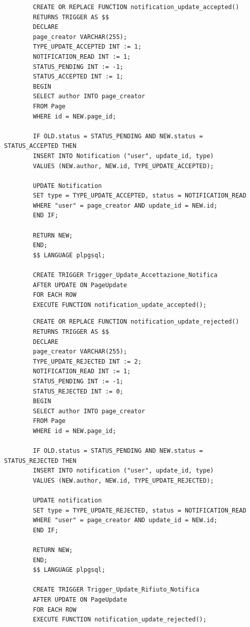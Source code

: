 \documentclass{article}
\begin{document}
	\begin{lstlisting}
		CREATE OR REPLACE FUNCTION notification_update_accepted()
		RETURNS TRIGGER AS $$
		DECLARE
		page_creator VARCHAR(255);
		TYPE_UPDATE_ACCEPTED INT := 1;
		NOTIFICATION_READ INT := 1;
		STATUS_PENDING INT := -1;
		STATUS_ACCEPTED INT := 1;
		BEGIN
		SELECT author INTO page_creator
		FROM Page
		WHERE id = NEW.page_id;
		
		IF OLD.status = STATUS_PENDING AND NEW.status = STATUS_ACCEPTED THEN
		INSERT INTO Notification ("user", update_id, type)
		VALUES (NEW.author, NEW.id, TYPE_UPDATE_ACCEPTED);
		
		UPDATE Notification
		SET type = TYPE_UPDATE_ACCEPTED, status = NOTIFICATION_READ
		WHERE "user" = page_creator AND update_id = NEW.id;
		END IF;
		
		RETURN NEW;
		END;
		$$ LANGUAGE plpgsql;
		
		CREATE TRIGGER Trigger_Update_Accettazione_Notifica
		AFTER UPDATE ON PageUpdate
		FOR EACH ROW
		EXECUTE FUNCTION notification_update_accepted();
	\end{lstlisting}
	
	\begin{lstlisting}
		CREATE OR REPLACE FUNCTION notification_update_rejected()
		RETURNS TRIGGER AS $$
		DECLARE
		page_creator VARCHAR(255);
		TYPE_UPDATE_REJECTED INT := 2;
		NOTIFICATION_READ INT := 1;
		STATUS_PENDING INT := -1;
		STATUS_REJECTED INT := 0;
		BEGIN
		SELECT author INTO page_creator
		FROM Page
		WHERE id = NEW.page_id;
		
		IF OLD.status = STATUS_PENDING AND NEW.status = STATUS_REJECTED THEN
		INSERT INTO notification ("user", update_id, type)
		VALUES (NEW.author, NEW.id, TYPE_UPDATE_REJECTED);
		
		UPDATE notification
		SET type = TYPE_UPDATE_REJECTED, status = NOTIFICATION_READ
		WHERE "user" = page_creator AND update_id = NEW.id;
		END IF;
		
		RETURN NEW;
		END;
		$$ LANGUAGE plpgsql;
		
		CREATE TRIGGER Trigger_Update_Rifiuto_Notifica
		AFTER UPDATE ON PageUpdate
		FOR EACH ROW
		EXECUTE FUNCTION notification_update_rejected();
	\end{lstlisting}
	
	
	
	
	
	
\end{document}
